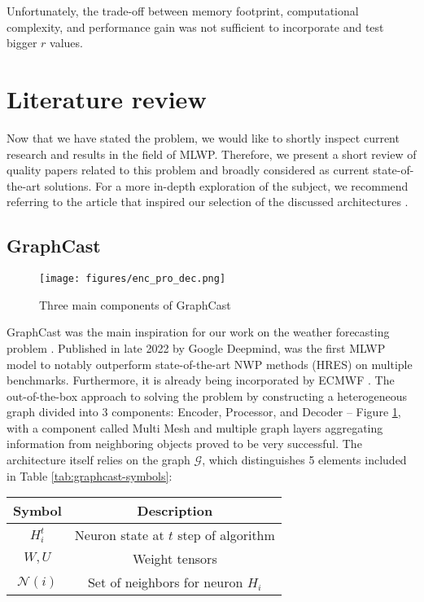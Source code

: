 Unfortunately, the trade-off between memory footprint, computational complexity, and performance gain was not sufficient to incorporate and test bigger $r$ values.

 
 \section{Literature review}
Now that we have stated the problem, we would like to shortly inspect current research and results in the field of MLWP. Therefore, we present a short review of quality papers related to this problem and broadly considered as current state-of-the-art solutions. For a more in-depth exploration of the subject, we recommend referring to the article that inspired our selection of the discussed architectures \cite{app132112019}.

\subsection{GraphCast} \label{sec:graphcast}
\begin{figure}[!ht]
    \centering
    \texttt{[image: figures/enc\_pro\_dec.png]}
    \caption{Three main components of GraphCast \cite{lam2023graphcast}}
    \label{fig:enc_pro_dec}
\end{figure}

GraphCast was the main inspiration for our work on the weather forecasting problem \cite{lam2023graphcast}. Published in late 2022 by Google Deepmind, was the first MLWP model to notably outperform state-of-the-art NWP methods (HRES) on multiple benchmarks. Furthermore, it is already being incorporated by ECMWF \cite{graphcast-deepmind}. The out-of-the-box approach to solving the problem by constructing a heterogeneous graph divided into 3 components: Encoder, Processor, and Decoder -- Figure \ref{fig:enc_pro_dec}, with a component called Multi Mesh and multiple graph layers aggregating information from neighboring objects proved to be very successful. The architecture itself relies on the graph $\mathcal{G}$, which distinguishes 5 elements included in Table \ref{tab:graphcast-symbols}:

\begin{table}[!ht]
    \centering
    \begin{tabular}{|c|c|}
        \hline
        Symbol & Description \\
        \hline
        $H_i^t$& Neuron state at $t$ step of algorithm \\
        $W,U$ & Weight tensors \\
        $\mathcal{N}(i)$ & Set of neighbors for neuron $H_i$ \\
        \hline
    \end{tabular}
\end{table}

